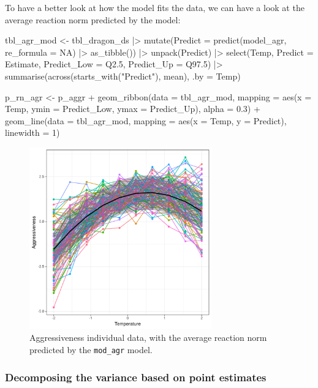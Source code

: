 \documentclass[a4paper,12pt,twoside]{article}
\begin{document}
To have a better look at how the model fits the data, we can have a look at the average reaction norm predicted by the model:
\begin{Rinput}
tbl_agr_mod <-
    tbl_dragon_ds |>
    mutate(Predict = predict(model_agr, re_formula = NA) |>
                     as_tibble()) |>
    unpack(Predict) |>
    select(Temp,
           Predict = Estimate,
           Predict_Low = Q2.5,
           Predict_Up  = Q97.5) |>
    summarise(across(starts_with("Predict"), mean),
              .by = Temp)

p_rn_agr <-
    p_aggr +
    geom_ribbon(data = tbl_agr_mod,
                mapping = aes(x = Temp, ymin = Predict_Low, ymax = Predict_Up),
                alpha = 0.3) +
    geom_line(data = tbl_agr_mod,
              mapping = aes(x = Temp, y = Predict),
              linewidth = 1)
\end{Rinput}

\begin{figure}[h!]
  \includegraphics[width = 0.7\textwidth]{Aggressiveness_discrete_pred.pdf}
  \caption{Aggressiveness individual data, with the average reaction norm predicted by the \texttt{mod\_agr} model.}
  \label{fig_pred_agr}
\end{figure}

\subsubsection{Decomposing the variance based on point estimates}
\end{document}
